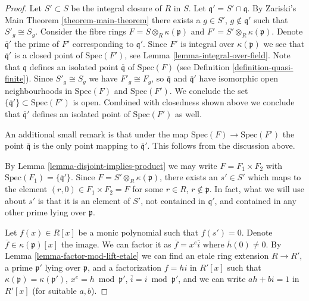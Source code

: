 \begin{proof}
Let $S' \subset S$ be the integral closure of $R$ in $S$.
Let $\mathfrak q' = S' \cap \mathfrak q$.
By Zariski's Main Theorem \ref{theorem-main-theorem}
there exists a $g \in S'$, $g \not \in \mathfrak q'$ such
that $S'_g \cong S_g$. Consider the fibre rings
$F = S \otimes_R \kappa(\mathfrak p)$ and
$F' = S' \otimes_R \kappa(\mathfrak p)$. Denote $\overline{\mathfrak q}'$
the prime of $F'$ corresponding to $\mathfrak q'$. Since
$F'$ is integral over $\kappa(\mathfrak p)$ we see
that $\overline{\mathfrak q}'$ is a closed point of
$\text{Spec}(F')$, see Lemma \ref{lemma-integral-over-field}.
Note that $\mathfrak q$ defines an isolated point $\overline{\mathfrak q}$ of
$\text{Spec}(F)$ (see Definition \ref{definition-quasi-finite}).
Since $S'_g \cong S_g$ we have $F'_g \cong F_g$,
so $\overline{\mathfrak q}$ and $\overline{\mathfrak q}'$
have isomorphic open neighbourhoods in $\text{Spec}(F)$
and $\text{Spec}(F')$. We conclude the set
$\{\overline{\mathfrak q}'\} \subset \text{Spec}(F')$ is
open. Combined with closedness shown above
we conclude that $\overline{\mathfrak q}'$ defines
an isolated point of $\text{Spec}(F')$ as well.

\medskip\noindent
An additional small remark is that under the map
$\text{Spec}(F) \to \text{Spec}(F')$ the point $\overline{\mathfrak q}$
is the only point mapping to $\overline{\mathfrak q}'$. This follows
from the discussion above.

\medskip\noindent
By Lemma \ref{lemma-disjoint-implies-product} we may write
$F = F_1 \times F_2$ with
$\text{Spec}(F_1) = \{\overline{\mathfrak q}'\}$.
Since $F = S' \otimes_R \kappa(\mathfrak p)$, there
exists an $s' \in S'$ which maps to the element
$(r, 0) \in F_1 \times F_2 = F$ for some $r \in R$, $r \not \in \mathfrak p$.
In fact, what we will use about $s'$ is that it is an element of $S'$,
not contained in $\mathfrak q'$, and contained in any other prime
lying over $\mathfrak p$.

\medskip\noindent
Let $f(x) \in R[x]$ be a monic polynomial such that $f(s') = 0$.
Denote $\overline{f} \in \kappa(\mathfrak p)[x]$ the image.
We can factor it as $\overline{f} = x^e \overline{i}$ where
$\overline{h}(0) \not = 0$. By Lemma \ref{lemma-factor-mod-lift-etale}
we can find an etale ring extension $R \to R'$,
a prime $\mathfrak p'$ lying over $\mathfrak p$, and
a factorization $f = h i$ in $R'[x]$ such that
$\kappa(\mathfrak p) = \kappa(\mathfrak p')$,
$x^e = h \bmod \mathfrak p'$,
$\overline{i} = i \bmod \mathfrak p'$, and
we can write $a h + b i = 1$ in $R'[x]$ (for suitable $a, b$).


\end{proof}
